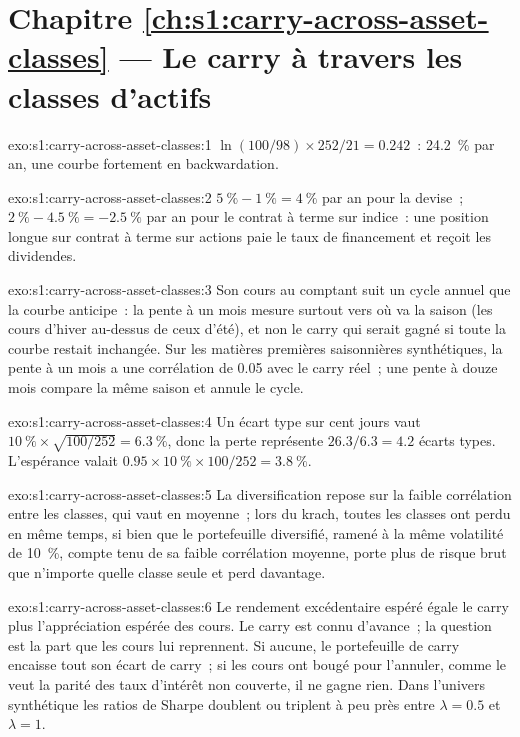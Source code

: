 \section*{Chapitre \ref{ch:s1:carry-across-asset-classes} --- Le carry à travers les classes d'actifs}

\begin{solution}{exo:s1:carry-across-asset-classes:1}
$\ln(100/98) \times 252/21 = 0.242$~: 24.2~\% par an, une courbe fortement en backwardation.
\end{solution}

\begin{solution}{exo:s1:carry-across-asset-classes:2}
$5~\% - 1~\% = 4~\%$ par an pour la devise~; $2~\% - 4.5~\% = -2.5~\%$ par an pour le contrat à terme sur indice~: une position longue sur contrat à terme sur actions paie le taux de financement et
reçoit les dividendes.
\end{solution}

\begin{solution}{exo:s1:carry-across-asset-classes:3}
Son cours au comptant suit un cycle annuel que la courbe anticipe~: la pente à un mois mesure surtout vers où va la saison (les cours d'hiver au-dessus
de ceux d'été), et non le carry qui serait gagné si toute la courbe restait inchangée. Sur les matières premières saisonnières synthétiques, la pente à un mois a une
corrélation de 0.05 avec le carry réel~; une pente à douze mois compare la même saison et annule le cycle.
\end{solution}

\begin{solution}{exo:s1:carry-across-asset-classes:4}
Un écart type sur cent jours vaut $10~\% \times \sqrt{100/252} = 6.3~\%$, donc la perte représente $26.3/6.3 = 4.2$ écarts types. L'espérance valait $0.95 \times
10~\% \times 100/252 = 3.8~\%$.
\end{solution}

\begin{solution}{exo:s1:carry-across-asset-classes:5}
La diversification repose sur la faible corrélation entre les classes, qui vaut en moyenne~; lors du krach, toutes les classes ont perdu en même temps, si bien que le portefeuille diversifié, ramené
à la même volatilité de 10~\%, compte tenu de sa faible corrélation moyenne, porte plus de risque brut que n'importe quelle classe seule et perd davantage.
\end{solution}

\begin{solution}{exo:s1:carry-across-asset-classes:6}
Le rendement excédentaire espéré égale le carry plus l'appréciation espérée des cours. Le carry est connu d'avance~; la question est la part que les cours lui reprennent. Si aucune,
le portefeuille de carry encaisse tout son écart de carry~; si les cours ont bougé pour l'annuler, comme le veut la parité des taux d'intérêt non couverte, il ne gagne rien. Dans l'univers synthétique
les ratios de Sharpe doublent ou triplent à peu près entre $\lambda = 0.5$ et $\lambda = 1$.
\end{solution}

